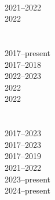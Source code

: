 \documentclass[10pt]{designcv}
\begin{document}
\hfill
\begin{minipage}[t]{0.15\textwidth}
\ \\
2021--2022\\
2022\\
\ \\
\ \\
2017--present\\
2017--2018\\
2022--2023\\
2022\\
2022\\
\ \\
\ \\
2017--2023\\
2017--2023\\
2017--2019\\
2021--2022\\
2023--present\\
2024--present\\
\end{minipage}
\hfill


\clearpage

\end{document}
